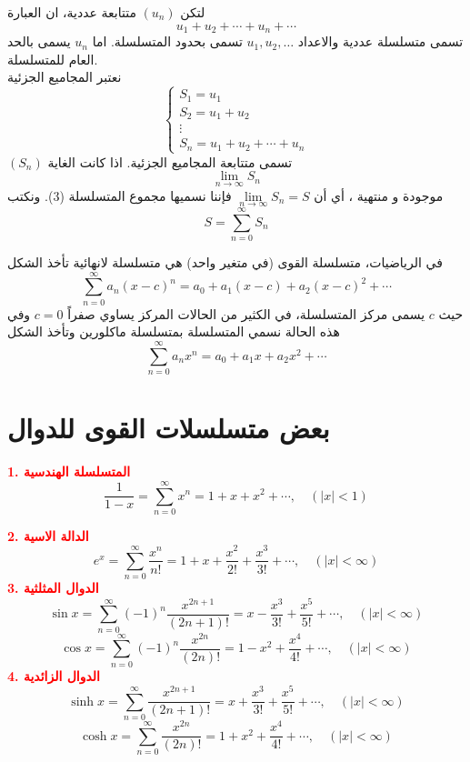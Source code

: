 \begin{definition}
	لتكن $(u_n)$ متتابعة عددية، ان العبارة
	\begin{equation}
		u_1 + u_2 + \cdots + u_n + \cdots
	\end{equation}
	تسمى متسلسلة عددية والاعداد $u_1,u_2,\dots$ تسمى بحدود المتسلسلة. اما $u_n$ يسمى بالحد العام للمتسلسلة.\\
	نعتبر المجاميع الجزئية
	\[
	\left\{
	\begin{array}{l}
		S_1 = u_1\\
		S_2 = u_1+u_2\\
		\vdots\\
		S_n = u_1 + u_2 + \cdots + u_n
	\end{array}
	\right.
	\]
	$(S_n)$ تسمى متتابعة المجاميع الجزئية. اذا كانت الغاية
	\begin{equation}
		\lim\limits_{n\to \infty} S_n
	\end{equation}
	موجودة و منتهية ، أي أن $\lim\limits_{n\to \infty} S_n = S$ فإننا نسميها مجموع المتسلسلة (3). ونكتب
	\begin{equation}
		S = \sum_{n=0}^{\infty} S_n
	\end{equation}
\end{definition}

\begin{definition}
	في الرياضيات، متسلسلة القوى (في متغير واحد) هي متسلسلة لانهائية تأخذ الشكل
	\begin{equation}
		\sum_{n=0}^{\infty} a_n (x-c)^n = a_0 + a_1(x-c) + a_2 (x-c)^2  + \cdots
	\end{equation}
	حيث $c$ يسمى مركز المتسلسلة، في الكثير من الحالات المركز يساوي صفراً $c=0$ وفي هذه الحالة نسمي المتسلسلة بمتسلسلة ماكلورين وتأخذ الشكل
	\begin{equation}
		\sum_{n=0}^{\infty} a_n x^n = a_0 + a_1 x + a_2 x^2 + \cdots
	\end{equation}
\end{definition}

\section{بعض متسلسلات القوى للدوال}
\textcolor{red}{\textbf{1. المتسلسلة الهندسية}}
\[
\frac{1}{1-x} = \sum_{n=0}^{\infty} x^n = 1+x+x^2 + \cdots, \quad (|x| < 1)
\]

\noindent
\textcolor{red}{\textbf{2. الدالة الاسية}}
\[
e^x = \sum_{n=0}^{\infty} \frac{x^n }{n!} = 1 + x + \frac{x^2}{2!} +  \frac{x^3}{3!}+ \cdots , \quad (|x| < \infty)
\]
\textcolor{red}{\textbf{3. الدوال المثلثية}}
\[
\sin x = \sum_{n=0}^{\infty} (-1)^n \frac{x^{2n+1}}{(2n+1)!} = x - \frac{x^3}{3!} + \frac{x^5}{5!} + \cdots, \quad (|x|<\infty)
\]
\[
\cos x = \sum_{n=0}^{\infty} (-1)^n \frac{x^{2n}}{(2n)!} = 1- x^2 + \frac{x^4 }{4!} + \cdots, \quad (|x| < \infty)
\]
\textcolor{red}{\textbf{4. الدوال الزائدية}}
\[
\sinh x = \sum_{n=0}^{\infty} \frac{x^{2n+1}}{(2n+1)!} = x + \frac{x^3}{3!} + \frac{x^5}{5!} + \cdots, \quad (|x|<\infty)
\]
\[
\cosh x = \sum_{n=0}^{\infty} \frac{x^{2n}}{(2n)!} = 1+ x^2 + \frac{x^4 }{4!} + \cdots, \quad (|x| < \infty)
\]